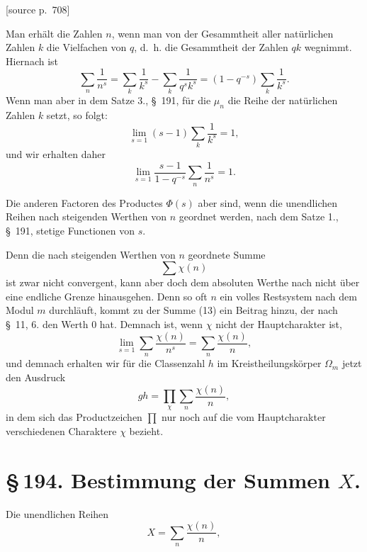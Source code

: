 \documentclass[11pt]{article}
\newcommand{\srcpage}[1]{\par\medskip\noindent\textsf{[source p.~#1]}\par\smallskip}
\begin{document}
\srcpage{708}
Man erhält die Zahlen $n$, wenn man von der Gesammtheit aller natürlichen Zahlen $k$ die Vielfachen von $q$, d.\ h. die Gesammtheit der Zahlen $qk$ wegnimmt. Hiernach ist
\[
\sum_n\frac1{n^s}=\sum_k\frac1{k^s}-\sum_k\frac1{q^s k^s}
=(1-q^{-s})\sum_k\frac1{k^s}.
\]
Wenn man aber in dem Satze 3., \S~191, für die $\mu_n$ die Reihe der natürlichen Zahlen $k$ setzt, so folgt:
\[
\lim_{s=1}(s-1)\sum_k\frac1{k^s}=1,
\]
und wir erhalten daher
\begin{equation}
\lim_{s=1}\frac{s-1}{1-q^{-s}}\sum_n\frac1{n^s}=1.
\tag{12}
\end{equation}

Die anderen Factoren des Productes $\Phi(s)$ aber sind, wenn die unendlichen Reihen nach steigenden Werthen von $n$ geordnet werden, nach dem Satze 1., \S~191, stetige Functionen von $s$.

Denn die nach steigenden Werthen von $n$ geordnete Summe
\begin{equation}
\sum\chi(n)
\tag{13}
\end{equation}
ist zwar nicht convergent, kann aber doch dem absoluten Werthe nach nicht über eine endliche Grenze hinausgehen. Denn so oft $n$ ein volles Restsystem nach dem Modul $m$ durchläuft, kommt zu der Summe (13) ein Beitrag hinzu, der nach \S~11, 6. den Werth $0$ hat. Demnach ist, wenn $\chi$ nicht der Hauptcharakter ist,
\begin{equation}
\lim_{s=1}\sum_n\frac{\chi(n)}{n^s}=\sum_n\frac{\chi(n)}{n},
\tag{14}
\end{equation}
und demnach erhalten wir für die Classenzahl $h$ im Kreistheilungskörper $\Omega_m$ jetzt den Ausdruck
\begin{equation}
gh=\prod_\chi\sum_n\frac{\chi(n)}{n},
\tag{15}
\end{equation}
in dem sich das Productzeichen $\prod$ nur noch auf die vom Hauptcharakter verschiedenen Charaktere $\chi$ bezieht.

\section*{\S\,194. Bestimmung der Summen $X$.}

Die unendlichen Reihen
\begin{equation}
X=\sum_n\frac{\chi(n)}{n},
\tag{1}
\end{equation}
\end{document}
